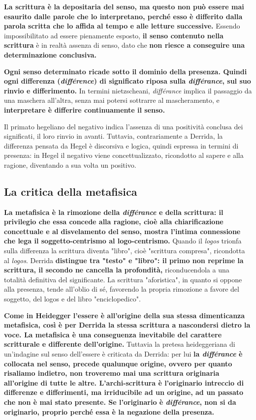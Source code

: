 \textbf{La scrittura è la depositaria del senso, ma questo non
può essere mai esaurito dalle parole che lo interpretano,
perché esso è differito dalla parola scritta che lo affida
al tempo e alle letture successive.}
Essendo impossibilitato ad essere pienamente
esposto, \textbf{il senso contenuto nella scrittura} è
in realtà assenza di senso, dato che \textbf{non
riesce a conseguire una determinazione
conclusiva.}

\textbf{Ogni senso determinato ricade sotto il dominio della
presenza.
Quindi ogni differenza (\textit{différence}) di significato riposa sulla
\textit{différance}, sul suo rinvio e differimento.}
In termini nietzscheani, \textit{différance} implica il
passaggio da una maschera all'altra, senza mai
potersi sottrarre al mascheramento, e \textbf{interpretare è
differire continuamente il senso.}

Il primato hegeliano del negativo indica l'assenza
di una positività conclusa dei significati, il
loro rinvio in avanti. Tuttavia, contrariamente a Derrida, la differenza
pensata da Hegel è discorsiva e logica, 
quindi espressa in termini di presenza: in Hegel
il negativo viene concettualizzato, ricondotto
al sapere e alla ragione, diventando a
sua volta un positivo.

\subsection{La critica della metafisica}

\textbf{La metafisica è la rimozione della \textit{différance} e
della scrittura: il privilegio che essa concede alla
ragione, cioè alla chiarificazione concettuale e
al disvelamento del senso, mostra l'intima
connessione che lega il soggetto-centrismo al
logo-centrismo.}
Quando il \textit{logos} trionfa sulla differenza la scrittura
diventa "libro", cioè "scrittura compresa", ricondotta
al \textit{logos}. Derrida \textbf{distingue tra "testo" e "libro":
il primo non reprime la scrittura, il secondo ne cancella
la profondità,} riconducendola
a una totalità definitiva del significante.
La scrittura "aforistica", in quanto si oppone
alla presenza, tende all'oblio di sé, favorendo
la propria rimozione a favore del soggetto, del
logos e del libro "enciclopedico".

\textbf{Come in Heidegger l'essere è all'origine della
sua stessa dimenticanza metafisica, così è per
Derrida la stessa scrittura a nascondersi dietro
la voce. La metafisica è una conseguenza
inevitabile del carattere scritturale e differente
dell'origine.} Tuttavia la pretesa heideggeriana
di un'indagine sul senso dell'essere è criticata
da Derrida: per lui \textbf{la \textit{différance} è collocata
nel senso, precede qualunque origine, ovvero per
quanto risaliamo indietro, non troveremo
mai una scrittura originaria all'origine di
tutte le altre. L'archi-scrittura è l'originario
intreccio di differenze e differimenti, ma
irriducibile ad un origine, ad un passato
che non è mai stato presente.
Se l'originario è \textit{différance}, non si da
originario, proprio perché essa è la negazione
della presenza.}

